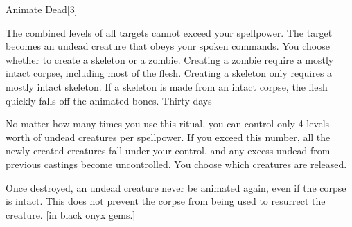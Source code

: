 \begin{spellsection}{Animate Dead}[3]
    \begin{spellheader}
    \end{spellheader}
    \begin{spellcontent}
        \begin{spelltargetinginfo}
        \end{spelltargetinginfo}
        \begin{spelleffects}
            \spellspecial The combined levels of all targets cannot exceed your spellpower.
            \spelleffect The target becomes an undead creature that obeys your spoken commands. You choose whether to create a skeleton or a zombie. Creating a zombie require a mostly intact corpse, including most of the flesh. Creating a skeleton only requires a mostly intact skeleton. If a skeleton is made from an intact corpse, the flesh quickly falls off the animated bones.
            \spelldur Thirty days
        \end{spelleffects}
    \end{spellcontent}
    \begin{spellfooter}
        \spellnotes No matter how many times you use this ritual, you can control only 4 levels worth of undead creatures per spellpower. If you exceed this number, all the newly created creatures fall under your control, and any excess undead from previous castings become uncontrolled. You choose which creatures are released.

        Once destroyed, an undead creature never be animated again, even if the corpse is intact. This does not prevent the corpse from being used to resurrect the creature.
        [in black onyx gems.]
    \end{spellfooter}
    \begin{spellaugments}
    \end{spellaugments}
\end{spellsection}

